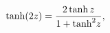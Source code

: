 \[\mathop{\tanh\/}\nolimits\!\left(2z\right)=\frac{2\mathop{\tanh\/}\nolimits z}%
{1+{\mathop{\tanh\/}\nolimits^{2}}z},\]